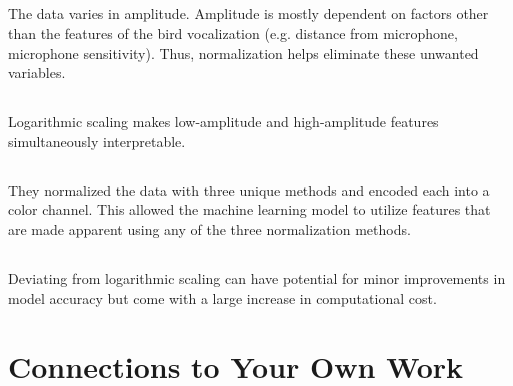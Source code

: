 \documentclass[11pt]{article}
\begin{document}
\subsection{} %
\begin{mdframed}
    The data varies in amplitude. Amplitude is mostly dependent on factors other
    than the features of the bird vocalization (e.g. distance from microphone,
    microphone sensitivity). Thus, normalization helps eliminate these unwanted
    variables.
\end{mdframed}

\subsection{} %
\begin{mdframed}
    Logarithmic scaling makes low-amplitude and high-amplitude features
    simultaneously interpretable.
\end{mdframed}

\subsection{} %
\begin{mdframed}
    They normalized the data with three unique methods and encoded each into a
    color channel. This allowed the machine learning model to utilize features
    that are made apparent using any of the three normalization methods.    
\end{mdframed}

\subsection{} %
\begin{mdframed}
    Deviating from logarithmic scaling can have potential for minor improvements
    in model accuracy but come with a large increase in computational cost.
\end{mdframed}

\section{Connections to Your Own Work}
\end{document}
